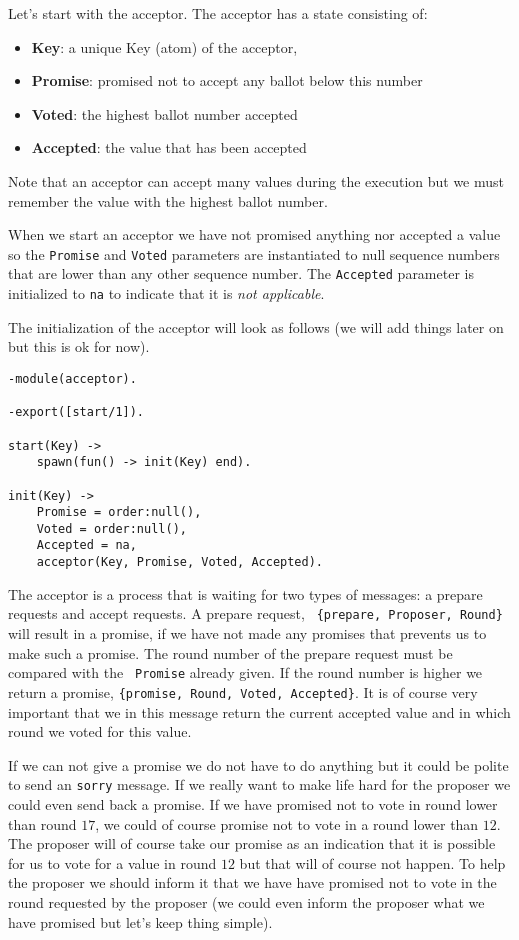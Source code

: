 \documentclass[a4paper,11pt]{article}
\begin{document}
Let's start with the acceptor. The acceptor has a state consisting of:

\begin{itemize}
\item {\bf Key}: a unique Key (atom) of the acceptor,
\item {\bf Promise}: promised not to accept any ballot below this number
\item {\bf Voted}: the highest ballot number accepted
\item {\bf Accepted}: the value that has been accepted
\end{itemize}

Note that an acceptor can accept many values during the execution but
we must remember the value with the highest ballot number. 

When we start an acceptor we have not promised anything nor accepted a
value so the {\tt Promise} and {\tt Voted} parameters are instantiated
to null sequence numbers that are lower than any other sequence
number. The {\tt Accepted} parameter is initialized to {\tt na} to
indicate that it is {\it not applicable}.

The initialization of the acceptor will look as follows (we will add
things later on but this is ok for now). 

\begin{verbatim}
-module(acceptor).

-export([start/1]).

start(Key) ->
    spawn(fun() -> init(Key) end).

init(Key) ->
    Promise = order:null(), 
    Voted = order:null(),
    Accepted = na,
    acceptor(Key, Promise, Voted, Accepted).
\end{verbatim}

The acceptor is a process that is waiting for two types of messages: a
prepare requests and accept requests. A prepare request, {\tt
  \{prepare, Proposer, Round\}} will result in a promise, if we have
not made any promises that prevents us to make such a promise. The
round number of the prepare request must be compared with the {\tt
  Promise} already given. If the round number is higher we return a
promise, {\tt \{promise, Round, Voted, Accepted\}}. It is of course
very important that we in this message return the current accepted
value and in which round we voted for this value.

If we can not give a promise we do not have to do anything but it
could be polite to send an {\tt sorry} message. If we really want to
make life hard for the proposer we could even send back a promise. If
we have promised not to vote in round lower than round $17$, we could
of course promise not to vote in a round lower than $12$. The proposer
will of course take our promise as an indication that it is possible
for us to vote for a value in round $12$ but that will of course not
happen. To help the proposer we should inform it that we have have
promised not to vote in the round requested by the proposer (we could
even inform the proposer what we have promised but let's keep thing
simple).
\end{document}
